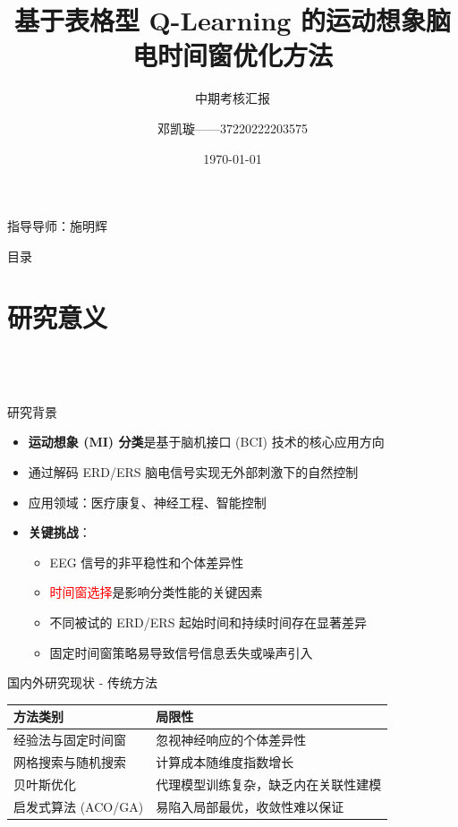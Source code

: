 \documentclass[aspectratio=169, 10pt]{beamer}
\title{基于表格型 Q-Learning 的运动想象脑电时间窗优化方法}
\subtitle{中期考核汇报}
\author{邓凯璇——37220222203575}
\institute{厦门大学信息学院}
\date{\today}
\newcommand{\supervisor}{指导导师：施明辉}
\begin{document}
\begin{frame}
\titlepage
\begin{center}
\large \supervisor
\end{center}
\end{frame}

\begin{frame}{目录}
\tableofcontents
\end{frame}

\newcommand{\chapterframe}{
  \begin{frame}
    \frametitle{\insertsectionhead}
    \centering
    \vspace{0.5cm}
    {\Huge \textbf{\thesection} \\[0.3cm]}
    {\Large \textcolor{blue}{\insertsectionhead}} \\[0.5cm]
  \end{frame}
}

\section{研究意义}
\chapterframe

\begin{frame}{研究背景}
\begin{itemize}
    \item \textbf{运动想象 (MI) 分类}是基于脑机接口 (BCI) 技术的核心应用方向
    \item 通过解码 ERD/ERS 脑电信号实现无外部刺激下的自然控制
    \item 应用领域：医疗康复、神经工程、智能控制
    \item \textbf{关键挑战}：
    \begin{itemize}
        \item EEG 信号的非平稳性和个体差异性
        \item \textcolor{red}{时间窗选择}是影响分类性能的关键因素
        \item 不同被试的 ERD/ERS 起始时间和持续时间存在显著差异
        \item 固定时间窗策略易导致信号信息丢失或噪声引入
    \end{itemize}
\end{itemize}
\end{frame}

\begin{frame}{国内外研究现状 - 传统方法}
\begin{table}
\centering
\large
\begin{tabular}{ll}
\toprule
\textbf{方法类别} & \textbf{局限性} \\
\midrule
经验法与固定时间窗 & 忽视神经响应的个体差异性 \\
网格搜索与随机搜索 & 计算成本随维度指数增长 \\
贝叶斯优化 & 代理模型训练复杂，缺乏内在关联性建模 \\
启发式算法 (ACO/GA) & 易陷入局部最优，收敛性难以保证 \\
\bottomrule
\end{tabular}
\end{table}
\end{frame}
\end{document}
